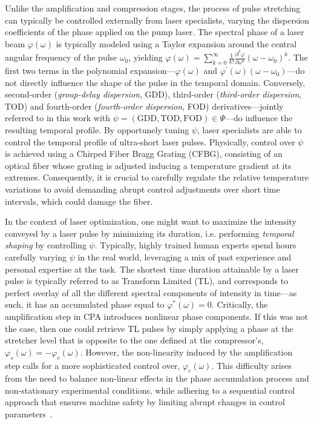 Unlike the amplification and compression stages, the process of pulse stretching can typically be controlled externally from laser specialists, varying the dispersion coefficients of the phase applied on the pump laser. The spectral phase of a laser beam \( \varphi(\omega) \) is typically modeled using a Taylor expansion around the central angular frequency of the pulse \( \omega_0 \), yielding \(
\varphi(\omega) = \sum_{k=0}^{\infty} \frac 1{k!}\frac{\partial^k \varphi}{\partial \omega^k} (\omega - \omega_0)^k \).
The first two terms in the polynomial expansion---\( \varphi(\omega) \) and \( \varphi^\prime(\omega)(\omega - \omega_0) \)---do not directly influence the shape of the pulse in the temporal domain. Conversely, second-order (\textit{group-delay dispersion}, GDD), third-order (\textit{third-order dispersion}, TOD) and fourth-order (\textit{fourth-order dispersion}, FOD) derivatives---jointly referred to in this work with \( \psi = (\text{GDD}, \text{TOD}, \text{FOD}) \in \Psi \)---do influence the resulting temporal profile. 
By opportunely tuning \( \psi \), laser specialists are able to control the temporal profile of ultra-short laser pulses. Physically, control over $\psi$ is achieved using a Chirped Fiber Bragg Grating (CFBG), consisting of an optical fiber whose grating is adjusted inducing a temperature gradient at its extremes. Consequently, it is crucial to carefully regulate the relative temperature variations to avoid demanding abrupt control adjustments over short time intervals, which could damage the fiber.

In the context of laser optimization, one might want to maximize the intensity conveyed by a laser pulse by minimizing its duration, i.e. performing \textit{temporal shaping} by controlling \( \psi \). Typically, highly trained human experts spend hours carefully varying \( \psi \) in the real world, leveraging a mix of past experience and personal expertise at the task. The shortest time duration attainable by a laser pulse is typically referred to as Transform Limited (TL), and corresponds to perfect overlay of all the different spectral components of intensity in time---as such, it has an accumulated phase equal to \( \varphi^*(\omega)=0 \). Critically, the amplification step in CPA introduces nonlinear phase components. If this was not the case, then one could retrieve TL pulses by simply applying a phase at the stretcher level that is opposite to the one defined at the compressor's, \( \varphi_s(\omega) = - \varphi_c(\omega) \). However, the non-linearity induced by the amplification step calls for a more sophisticated control over, \( \varphi_c(\omega) \). This difficulty arises from the need to balance non-linear effects in the phase accumulation process and non-stationary experimental conditions, while adhering to a sequential control approach that ensures machine safety by limiting abrupt changes in control parameters~\citep{capuano2023temporl}.


